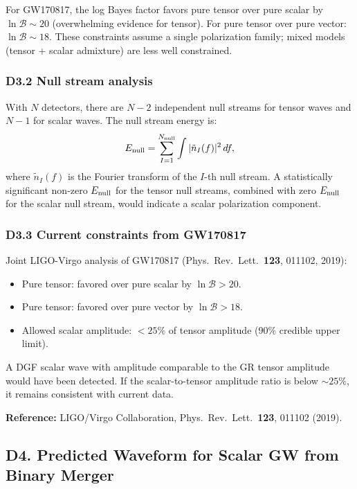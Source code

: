 \documentclass[reprint]{revtex4-2}
\begin{document}
For GW170817, the log Bayes factor favors pure tensor over pure scalar by $\ln\mathcal{B} \sim 20$ (overwhelming evidence for tensor). For pure tensor over pure vector: $\ln\mathcal{B} \sim 18$. These constraints assume a single polarization family; mixed models (tensor + scalar admixture) are less well constrained.

\subsubsection{D3.2 Null stream analysis}

With $N$ detectors, there are $N-2$ independent null streams for tensor waves and $N-1$ for scalar waves. The null stream energy is:
\begin{equation}
E_{\rm null} = \sum_{I=1}^{N_{\rm null}} \int |\tilde{n}_I(f)|^2\,df,
\end{equation}
where $\tilde{n}_I(f)$ is the Fourier transform of the $I$-th null stream. A statistically significant non-zero $E_{\rm null}$ for the tensor null streams, combined with zero $E_{\rm null}$ for the scalar null stream, would indicate a scalar polarization component.

\subsubsection{D3.3 Current constraints from GW170817}

Joint LIGO-Virgo analysis of GW170817 (Phys.\ Rev.\ Lett.\ \textbf{123}, 011102, 2019):
\begin{itemize}
\item Pure tensor: favored over pure scalar by $\ln\mathcal{B} > 20$.
\item Pure tensor: favored over pure vector by $\ln\mathcal{B} > 18$.
\item Allowed scalar amplitude: $< 25\%$ of tensor amplitude (90\% credible upper limit).
\end{itemize}

A DGF scalar wave with amplitude comparable to the GR tensor amplitude would have been detected. If the scalar-to-tensor amplitude ratio is below $\sim 25\%$, it remains consistent with current data.

\textbf{Reference:} LIGO/Virgo Collaboration, Phys.\ Rev.\ Lett.\ \textbf{123}, 011102 (2019).

\subsection{D4. Predicted Waveform for Scalar GW from Binary Merger}
\end{document}
